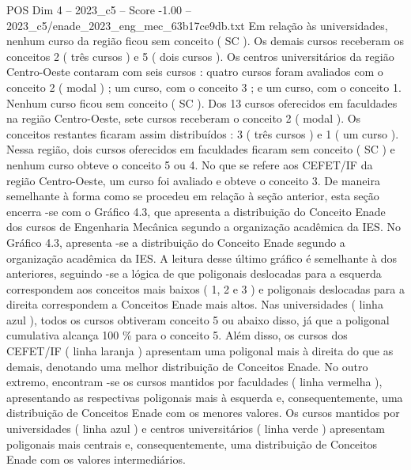 \begin{textsample}{POS Dim 4 – 2023\_c5 – Score -1.00 – 2023\_c5/enade\_2023\_eng\_mec\_63b17ce9db.txt}
Em relação às universidades, nenhum curso da região ficou sem conceito ( SC ).
Os demais cursos receberam os conceitos 2 ( três cursos ) e 5 ( dois cursos ).
Os centros universitários da região Centro-Oeste contaram com seis cursos : quatro cursos foram avaliados com o conceito 2 ( modal ) ; um curso, com o conceito 3 ; e um curso, com o conceito 1.
Nenhum curso ficou sem conceito ( SC ).
Dos 13 cursos oferecidos em faculdades na região Centro-Oeste, sete cursos receberam o conceito 2 ( modal ).
Os conceitos restantes ficaram assim distribuídos : 3 ( três cursos ) e 1 ( um curso ).
Nessa região, dois cursos oferecidos em faculdades ficaram sem conceito ( SC ) e nenhum curso obteve o conceito 5 ou 4.
No que se refere aos CEFET/IF da região Centro-Oeste, um curso foi avaliado e obteve o conceito 3.
De maneira semelhante à forma como se procedeu em relação à seção anterior, esta seção encerra -se com o Gráfico 4.3, que apresenta a distribuição do Conceito Enade dos cursos de Engenharia Mecânica segundo a organização acadêmica da IES.
No Gráfico 4.3, apresenta -se a distribuição do Conceito Enade segundo a organização acadêmica da IES.
A leitura desse último gráfico é semelhante à dos anteriores, seguindo -se a lógica de que poligonais deslocadas para a esquerda correspondem aos conceitos mais baixos ( 1, 2 e 3 ) e poligonais deslocadas para a direita correspondem a Conceitos Enade mais altos.
Nas universidades ( linha azul ), todos os cursos obtiveram conceito 5 ou abaixo disso, já que a poligonal cumulativa alcança 100 \% para o conceito 5.
Além disso, os cursos dos CEFET/IF ( linha laranja ) apresentam uma poligonal mais à direita do que as demais, denotando uma melhor distribuição de Conceitos Enade.
No outro extremo, encontram -se os cursos mantidos por faculdades ( linha vermelha ), apresentando as respectivas poligonais mais à esquerda e, consequentemente, uma distribuição de Conceitos Enade com os menores valores.
Os cursos mantidos por universidades ( linha azul ) e centros universitários ( linha verde ) apresentam poligonais mais centrais e, consequentemente, uma distribuição de Conceitos Enade com os valores intermediários.

\end{textsample}
